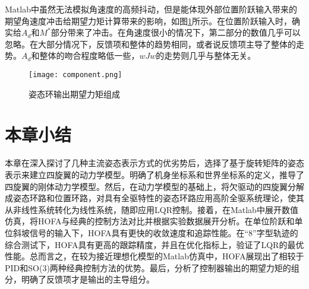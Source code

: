 Matlab中虽然无法模拟角速度的高频抖动，但是能体现外部位置阶跃输入带来的期望角速度冲击给期望力矩计算带来的影响，如图\ref{fig:com}所示。在位置阶跃输入时，确实给$A_d$和$M^*$部分带来了冲击。在角速度很小的情况下，第二部分的数值几乎可以忽略。在大部分情况下，反馈项和整体的趋势相同，或者说反馈项主导了整体的走势。$A_d$和整体的吻合程度略低一些，$wJw$的走势则几乎与整体无关。
\begin{figure}[!h]
  \centering
  \texttt{[image: component.png]}
  \caption{姿态环输出期望力矩组成}
  \label{fig:com}
\end{figure}

\section{本章小结}
本章在深入探讨了几种主流姿态表示方式的优劣势后，选择了基于旋转矩阵的姿态表示来建立四旋翼的动力学模型。明确了机身坐标系和世界坐标系的定义，推导了四旋翼的刚体动力学模型。然后，在动力学模型的基础上，将欠驱动的四旋翼分解成姿态环路和位置环路，对具有全驱特性的姿态环路应用高阶全驱系统理论，使其从非线性系统转化为线性系统，随即应用LQR控制。接着，在Matlab中展开数值仿真，将HOFA与经典的控制方法对比并根据实验数据展开分析。在单位阶跃和单位斜坡信号的输入下，HOFA具有更快的收敛速度和追踪性能。在“8”字型轨迹的综合测试下，HOFA具有更高的跟踪精度，并且在优化指标上，验证了LQR的最优性能。总而言之，在较为接近理想化模型的Matlab仿真中，HOFA展现出了相较于PID和SO(3)两种经典控制方法的优势。最后，分析了控制器输出的期望力矩的组分，明确了反馈项才是输出的主导组分。